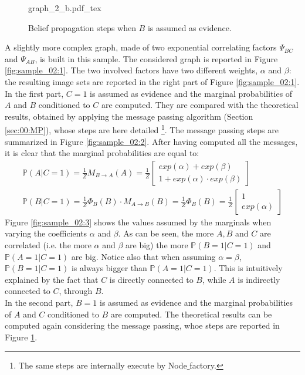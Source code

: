 \begin{figure}
	\centering
\def\svgwidth{0.65 \textwidth}
{graph_2_b.pdf_tex} 
\caption{Belief propagation steps when $B$ is assumed as evidence.}
\label{fig:sample_02:4}
\end{figure} 

A slightly more complex graph, made of two exponential correlating factors $\Psi_{BC}$ and $\Psi_{AB}$, is built in this sample. The considered graph is reported in Figure \ref{fig:sample_02:1}. The two involved factors have two different weights, $\alpha$ and $\beta$: the resulting image sets are reported in the right part of Figure \ref{fig:sample_02:1}. 
\\
In the first part, $C = 1$ is assumed as evidence and the marginal probabilities of $A$ and $B$ conditioned to $C$ are computed. They are compared with the theoretical results, obtained by applying the message passing algorithm (Section \ref{sec:00:MP}), whose steps are here detailed \footnote{The same steps are internally execute by Node$\_$factory.}. The message passing steps are summarized in Figure \ref{fig:sample_02:2}. After having computed all the messages, it is clear that the marginal probabilities are equal to:
\begin{eqnarray}
\mathbb{P}(A | C = 1) = \frac{1}{Z}   M_{B \rightarrow A}(A) = \frac{1}{Z} \begin{bmatrix} exp(\alpha) + exp(\beta) \\ 1 + exp(\alpha) \cdot exp(\beta)  \end{bmatrix} \\
\mathbb{P}(B | C = 1) = \frac{1}{Z} \Phi_B(B) \cdot M_{A \rightarrow B}(B) = \frac{1}{Z} \Phi_B(B) = \frac{1}{Z} \begin{bmatrix} 1 \\ exp(\alpha)  \end{bmatrix}
\end{eqnarray}
Figure \ref{fig:sample_02:3} shows the values assumed by the marginals when varying the coefficients $\alpha$  and $\beta$. As can be seen, the more $A,B$ and $C$ are correlated (i.e. the more $\alpha$  and $\beta$ are big) the more $\mathbb{P}(B=1|C=1)$ and $\mathbb{P}(A=1|C=1)$ are big. Notice also that when assuming $\alpha=\beta$,  $\mathbb{P}(B=1|C=1)$ is always bigger than $\mathbb{P}(A=1|C=1)$. This is intuitively explained by the fact that $C$ is directly connected to $B$, while $A$ is indirectly connected to $C$, through $B$.
\\
In the second part, $B = 1$ is assumed as evidence and the marginal probabilities of $A$ and $C$ conditioned to $B$ are computed. The theoretical results can be computed again considering the message passing, whoe steps are reported in Figure \ref{fig:sample_02:4}.
